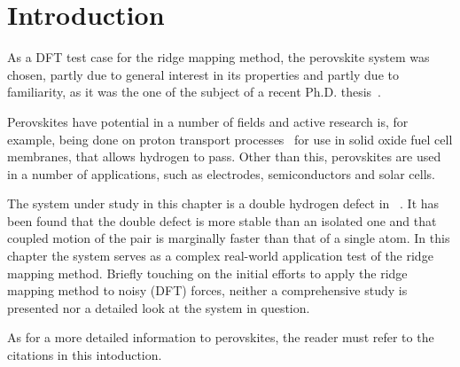 \section{Introduction}
\label{sec:perovskites-introduction}

As a DFT test case for the ridge mapping method, the  perovskite system was chosen, partly due to general interest in its properties and partly due to familiarity, as it was the one of the subject of a recent Ph.D. thesis~\cite{nicolai-2010}.

Perovskites have potential in a number of fields and active research is, for example, being done on proton transport processes~\cite{perovskites-hydrogen-diffusion-2007, perovskites-proton-transport-2008} for use in solid oxide fuel cell membranes, that allows hydrogen to pass\cite{perovskites-in-fuel-cells-1981}.
Other than this, perovskites are used in a number of applications, such as electrodes, semiconductors and solar cells.

The system under study in this chapter is a double hydrogen defect in ~\cite{double-defect-2011}.
It has been found that the double defect is more stable than an isolated one and that coupled motion of the pair is marginally faster than that of a single atom.
In this chapter the system serves as a complex real-world application test of the ridge mapping method.
Briefly touching on the initial efforts to apply the ridge mapping method to noisy (DFT) forces, neither a comprehensive study is presented nor a detailed look at the system in question.

As for a more detailed information to perovskites, the reader must refer to the citations in this intoduction.





